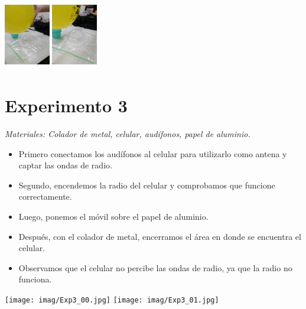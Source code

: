 \documentclass[a4paper, 12p]{article}
\newenvironment{Figura}
  {\par\medskip\noindent\minipage{\linewidth}}
  {\endminipage\par\medskip}
\begin{document}
\begin{multicols*}{2}
\begin{Figura}
    \centering
    \includegraphics[width=2cm, height=3cm]{imag/Exp2_03.jpg}
    \includegraphics[width=2cm, height=3cm]{imag/Exp2_04.jpg}
\end{Figura}   





    
\section*{Experimento 3}
\textit{Materiales: Colador de metal, celular, audífonos, papel de aluminio.}
\vspace{-\topsep}
    \begin{itemize}
       \setlength{\parskip}{0pt} 
       \setlength{\itemsep}{0pt plus 1pt}
        \item Primero conectamos los audífonos al celular para utilizarlo como antena y captar las ondas de radio.
        \item Segundo, encendemos la radio del celular y comprobamos que funcione correctamente.
        \item Luego, ponemos el móvil sobre el papel de aluminio.
        \item Después, con el colador de metal, encerramos el área en donde se encuentra el celular.
        \item Observamos que el celular no percibe las ondas de radio, ya que la radio no funciona.
    \end{itemize}
\vspace{-\topsep}

\begin{Figura}
    \centering
    \texttt{[image: imag/Exp3\_00.jpg]}
    \texttt{[image: imag/Exp3\_01.jpg]}
\end{Figura}



\end{multicols*}
\end{document}
